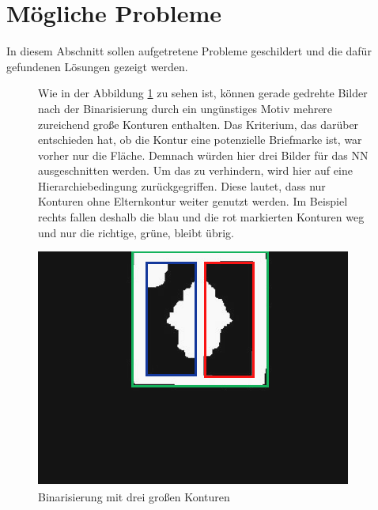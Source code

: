 \documentclass[12pt,toc=bib,toc=listof]{scrreprt}
\begin{document}
\section{Mögliche Probleme}
\label{sec_bv:probleme}
In diesem Abschnitt sollen aufgetretene Probleme geschildert und die dafür gefundenen Lösungen gezeigt werden.\\

\begin{figure}[h]
\begin{minipage}[t]{.75\linewidth}

Wie in der Abbildung \ref{fig:bv_prob1} zu sehen ist, können gerade gedrehte Bilder nach der Binarisierung durch ein ungünstiges Motiv mehrere zureichend große Konturen enthalten. Das Kriterium, das darüber entschieden hat, ob die Kontur eine potenzielle Briefmarke ist, war vorher nur die Fläche. Demnach würden hier drei Bilder für das NN ausgeschnitten werden. Um das zu verhindern, wird hier auf eine Hierarchiebedingung zurückgegriffen. Diese lautet, dass nur Konturen ohne Elternkontur weiter genutzt werden. Im Beispiel rechts fallen deshalb die blau und die rot markierten Konturen weg und nur die richtige, grüne, bleibt übrig.
\end{minipage}
\hfill
\begin{minipage}[t]{.2\linewidth}
\strut\vspace*{-\baselineskip}
\newline
  \includegraphics[width=\linewidth]{./../bilder/prob1_bin}
  \caption{Binarisierung mit drei großen Konturen}
  \label{fig:bv_prob1}
\end{minipage}
\end{figure}
\end{document}
